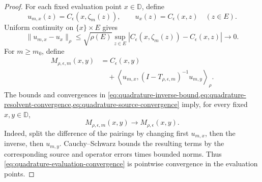 \begin{proof}
For each fixed evaluation point $x\in\mathbb D$, define
\[
 u_{m,x}(z)=C_\epsilon(x,\zeta_m(z)),\qquad
 u_x(z)=C_\epsilon(x,z)\quad(z\in E).
\]
Uniform continuity on $\{x\}\times E$ gives
\begin{equation}\label{eq:quadrature-source-convergence}
 \|u_{m,x}-u_x\|_\rho
 \le\sqrt{\rho(E)}\sup_{z\in E}
 |C_\epsilon(x,\zeta_m(z))-C_\epsilon(x,z)|\longrightarrow0.
\end{equation}
For $m\ge m_0$, define
\begin{equation}\label{eq:quadrature-resolvent-kernel}
 \begin{aligned}
 M_{\rho,\epsilon,m}(x,y)&=C_\epsilon(x,y)\\
 &\quad+\left\langle u_{m,x},
 (I-T_{\rho,\epsilon,m})^{-1}u_{m,y}\right\rangle_\rho.
 \end{aligned}
\end{equation}
The bounds and convergences in
\cref{eq:quadrature-inverse-bound,eq:quadrature-resolvent-convergence,eq:quadrature-source-convergence}
imply, for every fixed $x,y\in\mathbb D$,
\begin{equation}\label{eq:quadrature-evaluation-convergence}
 M_{\rho,\epsilon,m}(x,y)\longrightarrow M_{\rho,\epsilon}(x,y).
\end{equation}
Indeed, split the difference of the pairings by changing first
$u_{m,x}$, then the inverse, then $u_{m,y}$. Cauchy--Schwarz bounds
the resulting terms by the corresponding source and operator errors
times bounded norms. Thus \eqref{eq:quadrature-evaluation-convergence}
is pointwise convergence in the evaluation points.


\end{proof}

